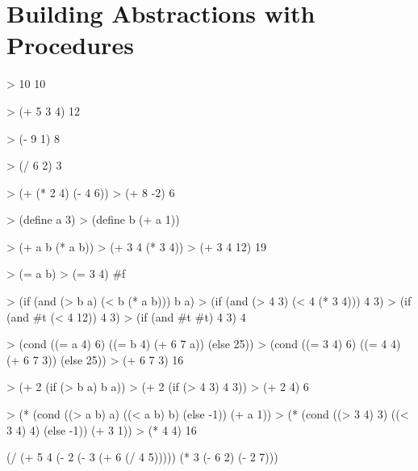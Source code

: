 \chapter{\Large{Building Abstractions with Procedures}}

\begin{lisp}
> 10
10
\end{lisp}
\begin{lisp}
> (+ 5 3 4)
12
\end{lisp}
\begin{lisp}
> (- 9 1)
8
\end{lisp}
\begin{lisp}
> (/ 6 2)
3
\end{lisp}
\begin{lisp}
> (+ (* 2 4) (- 4 6))
> (+ 8 -2)
6
\end{lisp}
\begin{lisp}
> (define a 3)
> (define b (+ a 1))
\end{lisp}
\begin{lisp}
> (+ a b (* a b))
> (+ 3 4 (* 3 4))
> (+ 3 4 12)
19
\end{lisp}
\begin{lisp}
> (= a b)
> (= 3 4)
#f
\end{lisp}
\begin{lisp}
> (if (and (> b a) (< b (* a b))) b a)
> (if (and (> 4 3) (< 4 (* 3 4))) 4 3)
> (if (and #t (< 4 12)) 4 3)
> (if (and #t #t) 4 3)
4
\end{lisp}
\begin{lisp}
> (cond ((= a 4) 6)
        ((= b 4) (+ 6 7 a))
        (else 25))
> (cond ((= 3 4) 6)
        ((= 4 4) (+ 6 7 3))
        (else 25))
> (+ 6 7 3)
16
\end{lisp}
\begin{lisp}
> (+ 2 (if (> b a) b a))
> (+ 2 (if (> 4 3) 4 3))
> (+ 2 4)
6
\end{lisp}
\begin{lisp}
> (* (cond ((> a b) a)
           ((< a b) b)
           (else -1))
     (+ a 1))
> (* (cond ((> 3 4) 3)
           ((< 3 4) 4)
           (else -1))
     (+ 3 1))
> (* 4 4)
16
\end{lisp}

\begin{lisp}
(/ (+ 5 4
      (- 2
         (- 3
            (+ 6 (/ 4 5)))))
   (* 3
      (- 6 2)
      (- 2 7)))
\end{lisp}


